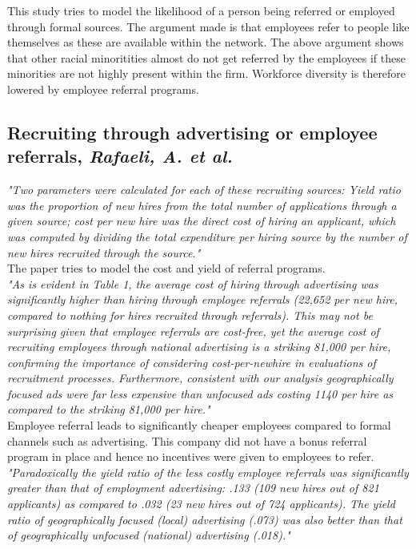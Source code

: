 \documentclass[a4paper, 11pt]{article} %
\begin{document}
This study tries to model the likelihood of a person being referred or employed through formal sources. The argument made is that employees refer to people like themselves as these are available within the network. The above argument shows that other racial minoritities almost do not get referred by the employees if these minorities are not highly present within the firm. Workforce diversity is therefore lowered by employee referral programs.

\subsection*{Recruiting through advertising or employee referrals, \emph{Rafaeli, A. et al.} \cite{fourth}}

\emph{"Two parameters were calculated for each of these recruiting sources: Yield
ratio was the proportion of new hires from the total number of applications
through a given source; cost per new hire was the direct cost of hiring an
applicant, which was computed by dividing the total expenditure per hiring
source by the number of new hires recruited through the source."}\\

The paper tries to model the cost and yield of referral programs.\\

\emph{"As is evident in Table 1, the average cost of hiring through advertising was
significantly higher than hiring through employee referrals (22,652 per new
hire, compared to nothing for hires recruited through referrals). This may
not be surprising given that employee referrals are cost-free, yet the average
cost of recruiting employees through national advertising is a striking
81,000 per hire, confirming the importance of considering cost-per-newhire
in evaluations of recruitment processes. Furthermore, consistent with
our analysis geographically focused ads were far less expensive than
unfocused ads costing 1140 per hire as compared to the striking 81,000 per
hire."}\\

Employee referral leads to significantly cheaper employees compared to formal channels such as advertising. This company did not have a bonus referral program in place and hence no incentives were given to employees to refer.\\

\emph{"Paradoxically the yield ratio of the less costly employee referrals was
significantly greater than that of employment advertising: .133 (109 new
hires out of 821 applicants) as compared to .032 (23 new hires out of 724
applicants). The yield ratio of geographically focused (local) advertising
(.073) was also better than that of geographically unfocused (national)
advertising (.018)."}\\
\end{document}
